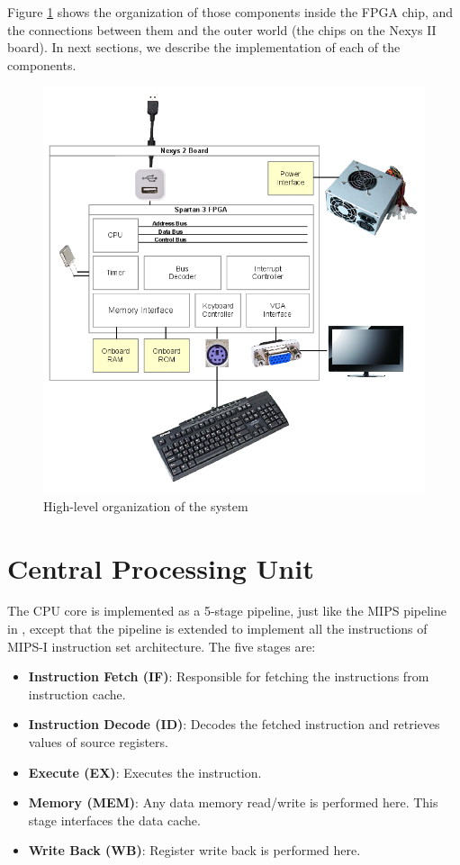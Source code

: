 \documentclass[oneside]{book}
\begin{document}
Figure \ref{fpga} shows the organization of those components inside
the FPGA chip, and the connections between them and the outer
world (the chips on the Nexys II board). In next sections, we describe
the implementation of each of the components.

\begin{figure}[H]
\begin{center}
\includegraphics[width=\textwidth]{fpga.png}
\end{center}
\caption{High-level organization of the system}
\label{fpga}
\end{figure}

\newpage

\section {Central Processing Unit}

The CPU core is implemented as a 5-stage pipeline, just like the
MIPS pipeline in \cite{comporg},
except that the pipeline is extended to implement all the
instructions of MIPS-I instruction set architecture. The five stages are:

\begin{itemize}
\item \textbf{Instruction Fetch (IF)}:
      Responsible for fetching the instructions from instruction cache.
\item \textbf{Instruction Decode (ID)}: Decodes the fetched instruction
      and retrieves values of source registers.
\item \textbf{Execute (EX)}: Executes the instruction.
\item \textbf{Memory (MEM)}: Any data memory read/write is performed here. This
      stage interfaces the data cache.
\item \textbf{Write Back (WB)}: Register write back is performed here.
\end{itemize}
\end{document}
